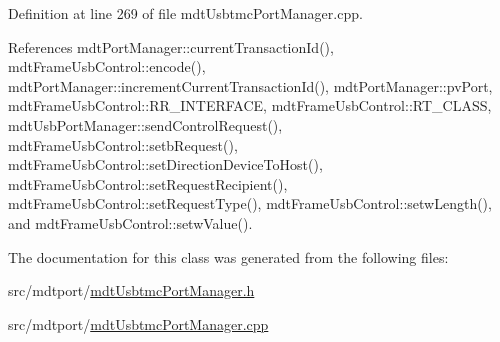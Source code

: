 Definition at line 269 of file mdt\-Usbtmc\-Port\-Manager.\-cpp.



References mdt\-Port\-Manager\-::current\-Transaction\-Id(), mdt\-Frame\-Usb\-Control\-::encode(), mdt\-Port\-Manager\-::increment\-Current\-Transaction\-Id(), mdt\-Port\-Manager\-::pv\-Port, mdt\-Frame\-Usb\-Control\-::\-R\-R\-\_\-\-I\-N\-T\-E\-R\-F\-A\-C\-E, mdt\-Frame\-Usb\-Control\-::\-R\-T\-\_\-\-C\-L\-A\-S\-S, mdt\-Usb\-Port\-Manager\-::send\-Control\-Request(), mdt\-Frame\-Usb\-Control\-::setb\-Request(), mdt\-Frame\-Usb\-Control\-::set\-Direction\-Device\-To\-Host(), mdt\-Frame\-Usb\-Control\-::set\-Request\-Recipient(), mdt\-Frame\-Usb\-Control\-::set\-Request\-Type(), mdt\-Frame\-Usb\-Control\-::setw\-Length(), and mdt\-Frame\-Usb\-Control\-::setw\-Value().



The documentation for this class was generated from the following files\-:\begin{DoxyCompactItemize}
\item 
src/mdtport/\hyperlink{mdt_usbtmc_port_manager_8h}{mdt\-Usbtmc\-Port\-Manager.\-h}\item 
src/mdtport/\hyperlink{mdt_usbtmc_port_manager_8cpp}{mdt\-Usbtmc\-Port\-Manager.\-cpp}\end{DoxyCompactItemize}
